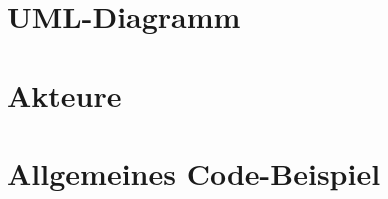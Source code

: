 \documentclass{lehramt-informatik-haupt}
\begin{document}
%

\section{UML-Diagramm}

\liEntwurfsBeobachterUml

%

\section{Akteure}

\liEntwurfsBeobachterAkteure

%

\section{Allgemeines Code-Beispiel}

\liEntwurfsBeobachterCode

\literatur
\end{document}
